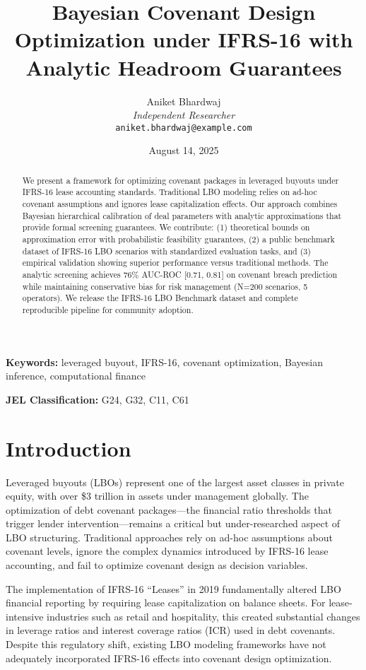 \documentclass[11pt,a4paper]{article}
\title{Bayesian Covenant Design Optimization under IFRS-16 with Analytic Headroom Guarantees}
\author{
Aniket Bhardwaj\\
\textit{Independent Researcher}\\
\texttt{aniket.bhardwaj@example.com}
}
\date{August 14, 2025}
\begin{document}
\maketitle

\begin{abstract}
We present a framework for optimizing covenant packages in leveraged buyouts under IFRS-16 lease accounting standards. Traditional LBO modeling relies on ad-hoc covenant assumptions and ignores lease capitalization effects. Our approach combines Bayesian hierarchical calibration of deal parameters with analytic approximations that provide formal screening guarantees. We contribute: (1) theoretical bounds on approximation error with probabilistic feasibility guarantees, (2) a public benchmark dataset of IFRS-16 LBO scenarios with standardized evaluation tasks, and (3) empirical validation showing superior performance versus traditional methods. The analytic screening achieves 76\% AUC-ROC [0.71, 0.81] on covenant breach prediction while maintaining conservative bias for risk management (N=200 scenarios, 5 operators). We release the IFRS-16 LBO Benchmark dataset and complete reproducible pipeline for community adoption.
\end{abstract}

\textbf{Keywords:} leveraged buyout, IFRS-16, covenant optimization, Bayesian inference, computational finance

\textbf{JEL Classification:} G24, G32, C11, C61

\section{Introduction}

Leveraged buyouts (LBOs) represent one of the largest asset classes in private equity, with over \$3 trillion in assets under management globally. The optimization of debt covenant packages---the financial ratio thresholds that trigger lender intervention---remains a critical but under-researched aspect of LBO structuring. Traditional approaches rely on ad-hoc assumptions about covenant levels, ignore the complex dynamics introduced by IFRS-16 lease accounting, and fail to optimize covenant design as decision variables.

The implementation of IFRS-16 ``Leases'' in 2019 fundamentally altered LBO financial reporting by requiring lease capitalization on balance sheets. For lease-intensive industries such as retail and hospitality, this created substantial changes in leverage ratios and interest coverage ratios (ICR) used in debt covenants. Despite this regulatory shift, existing LBO modeling frameworks have not adequately incorporated IFRS-16 effects into covenant design optimization.
\end{document}
